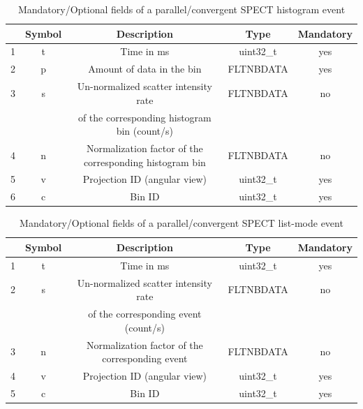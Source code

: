 \documentclass[a4paper, 11pt]{article}
\begin{document}
\begin{table} [h!]
  \small
  \caption{Mandatory/Optional fields of a parallel/convergent SPECT histogram event}
  \label{table_SPECT_conv_data_bin_histogram}
  \begin{center}
  \begin{tabular}{|c|c|c|c|c|}
  \hline
   & \textbf{Symbol} & \textbf{Description} & \textbf{Type} & \textbf{Mandatory}\\
  \hline
  \hline
  1 & t & Time in ms & uint32\_t & yes \\ \hline
  2 & p & Amount of data in the bin & FLTNBDATA & yes \\ \hline
  3 & s & Un-normalized scatter intensity rate & FLTNBDATA & no \\ 
  & & of the corresponding histogram bin (count/s) & &  \\ \hline
  4 & n & Normalization factor of the corresponding histogram bin & FLTNBDATA & no \\ \hline
  5 & v & Projection ID (angular view) & uint32\_t & yes \\ \hline
  6 & c & Bin ID & uint32\_t & yes \\ \hline
  \end{tabular}
  \end{center}
\end{table}

\begin{table} [h!]
  \small
  \caption{Mandatory/Optional fields of a parallel/convergent SPECT list-mode event}
  \label{table_SPECT_conv_data_bin_list-mode}
  \begin{center}
  \begin{tabular}{|c|c|c|c|c|}
  \hline
   & \textbf{Symbol} & \textbf{Description} & \textbf{Type} & \textbf{Mandatory}\\
  \hline
  \hline
  1 & t & Time in ms & uint32\_t & yes \\ \hline
  2 & s & Un-normalized scatter intensity rate & FLTNBDATA & no  \\
   & & of the corresponding event (count/s) &  & \\ \hline
  3 & n & Normalization factor of the corresponding event & FLTNBDATA & no \\ \hline
  4 & v & Projection ID (angular view) & uint32\_t & yes \\ \hline
  5 & c & Bin ID & uint32\_t & yes \\ \hline
  \end{tabular}
  \end{center}
\end{table}
\end{document}
